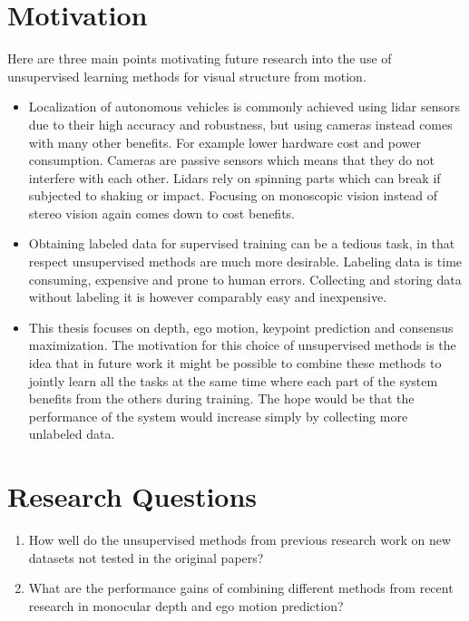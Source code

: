 \section{Motivation}

Here are three main points motivating future research into the use of unsupervised learning methods for visual structure from motion.


\begin{itemize}
	\item Localization of autonomous vehicles is commonly  achieved using lidar sensors due to their high accuracy and robustness, but using cameras instead comes with many other benefits\cite{lidarvscamera}. For example lower hardware cost and power consumption. Cameras are passive sensors which means that they do not interfere with each other. Lidars rely on spinning parts which can break if subjected to shaking or impact. Focusing on monoscopic vision instead of stereo vision again comes down to cost benefits.
	
	\item Obtaining labeled data for supervised training can be a tedious task, in that respect unsupervised methods are much more desirable. Labeling data is time consuming, expensive and prone to human errors. Collecting and storing data without labeling it is however comparably easy and inexpensive.
	
	\item This thesis focuses on depth, ego motion, keypoint prediction and consensus maximization. The motivation for this choice of unsupervised methods is the idea that in future work it might be possible to combine these methods to jointly learn all the tasks at the same time where each part of the system benefits from the others during training. The hope would be that the performance of the system would increase simply by collecting more unlabeled data.
\end{itemize}

\section{Research Questions}

\begin{enumerate}
	
	\item How well do the unsupervised methods from previous research work on new datasets not tested in the original papers?
	
	\item What are the performance gains of combining different methods from recent research in monocular depth and ego motion prediction?
	
\end{enumerate}

